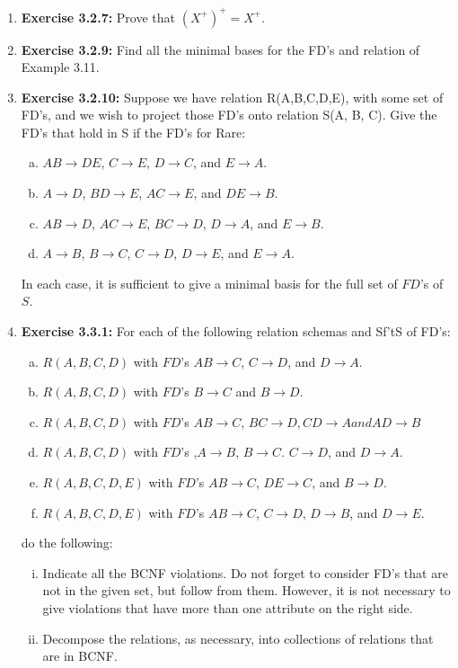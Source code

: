 \documentclass[12pt]{article}
\begin{document}
\begin{enumerate}[1.]
    \item \textbf{Exercise 3.2.7:} Prove that $(X^+)^+ = X^+$.

    \item \textbf{Exercise 3.2.9:} Find all the minimal bases for the FD's and relation of
    Example 3.11.

    \item \textbf{Exercise 3.2.10:} Suppose we have relation R(A,B,C,D,E), with some set
    of FD's, and we wish to project those FD's onto relation S(A, B, C). Give the
    FD's that hold in S if the FD's for Rare:

    \begin{enumerate}[a)]
        \item $AB \to DE$, $C \to E$, $D \to C$, and $E \to A$.
        \item $A \to D$, $BD \to E$, $AC \to E$, and $DE \to B$.
        \item $AB \to D$, $AC \to E$, $BC \to D$, $D \to A$, and $E \to B$.
        \item $A \to B$, $B \to C$, $C \to D$, $D \to E$, and $E \to A$.
    \end{enumerate}

    In each case, it is sufficient to give a minimal basis for the full set of $FD$'s of $S$.

    \item \textbf{Exercise 3.3.1:} For each of the following relation schemas and Sf'tS of FD's:

    \bigskip

    \begin{enumerate}[a)]
        \item $R(A, B, C, D)$ with $FD$'s $AB \to C$, $C \to D$, and $D \to A$.
        \item $R(A,B,C,D)$ with $FD$'s $B \to C$ and $B \to D$.
        \item $R(A, B, C, D)$ with $FD$'s $AB \to C$, $BC \to D, CD \to A and AD \to B$
        \item $R(A, B, C, D)$ with $FD$'s ,$A \to B$, $B \to C$. $C \to D$, and $D \to A$.
        \item $R(A, B, C, D, E)$ with $FD$'s $AB \to C$, $DE \to C$, and $B \to D$.
        \item $R(A, B, C, D, E)$ with $FD$'s $AB \to C$, $C \to D$, $D \to B$, and $D \to E$.
    \end{enumerate}

    do the following:

    \begin{enumerate}[i)]
        \item Indicate all the BCNF violations. Do not forget to consider FD's that are not in the given set, but follow from them. However, it is not necessary to give violations that have more than one attribute on the right side.
        \item Decompose the relations, as necessary, into collections of relations that are in BCNF.
    \end{enumerate}


\end{enumerate}
\end{document}
